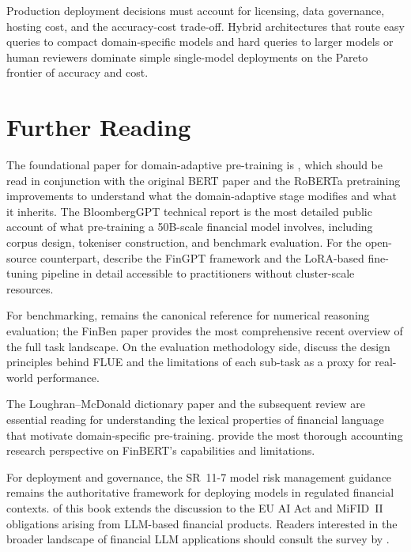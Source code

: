 Production deployment decisions must account for licensing, data governance, hosting
cost, and the accuracy-cost trade-off.  Hybrid architectures that route easy
queries to compact domain-specific models and hard queries to larger models or
human reviewers dominate simple single-model deployments on the Pareto frontier
of accuracy and cost.

\section{Further Reading}
\label{sec:ch08-further-reading}

The foundational paper for domain-adaptive pre-training is
\citet{gururangan2020dont}, which should be read in conjunction with the
original BERT paper \cite{devlin2019} and the RoBERTa pretraining improvements
\cite{liu2018} to understand what the domain-adaptive stage modifies and what
it inherits.  The BloombergGPT technical report \cite{wu2023bloomberggpt} is
the most detailed public account of what pre-training a 50B-scale financial model
involves, including corpus design, tokeniser construction, and benchmark evaluation.
For the open-source counterpart, \citet{Yang2023} describe the FinGPT
framework and the LoRA-based fine-tuning pipeline in detail accessible to practitioners
without cluster-scale resources.

For benchmarking, \citet{chen2021finqa} remains the canonical reference for
numerical reasoning evaluation; the FinBen paper \cite{xie2024finben} provides
the most comprehensive recent overview of the full task landscape.  On the
evaluation methodology side, \citet{shah2022flue} discuss the design principles
behind FLUE and the limitations of each sub-task as a proxy for real-world performance.

The Loughran--McDonald dictionary paper \cite{loughran2011liability} and the
subsequent review \cite{loughran2020textual} are essential reading for understanding
the lexical properties of financial language that motivate domain-specific
pre-training.  \citet{huang2023finbert} provide the most thorough accounting
research perspective on FinBERT's capabilities and limitations.

For deployment and governance, the SR~11-7 model risk management guidance
\cite{sr117} remains the authoritative framework for deploying
models in regulated financial contexts.  
of this book extends the discussion to the EU AI Act and MiFID~II obligations
arising from LLM-based financial products.  Readers interested in the broader
landscape of financial LLM applications should consult the survey by
\citet{li2023llmfinsurvey}.
